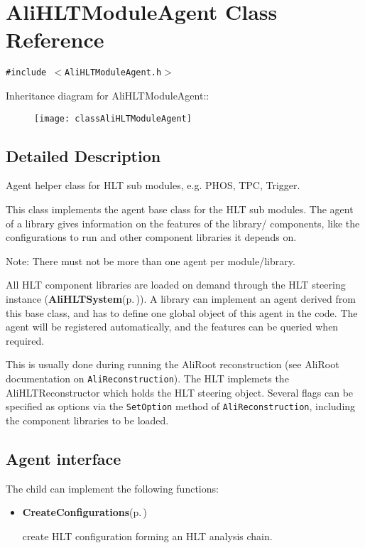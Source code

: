 \section{Ali\-HLTModule\-Agent Class Reference}
\label{classAliHLTModuleAgent}
{\tt \#include $<$Ali\-HLTModule\-Agent.h$>$}

Inheritance diagram for Ali\-HLTModule\-Agent::\begin{figure}[H]
\begin{center}
\leavevmode
\texttt{[image: classAliHLTModuleAgent]}
\end{center}
\end{figure}


\subsection{Detailed Description}
Agent helper class for HLT sub modules, e.g. PHOS, TPC, Trigger. 

This class implements the agent base class for the HLT sub modules. The agent of a library gives information on the features of the library/ components, like the configurations to run and other component libraries it depends on. \begin{Desc}
\item[Note:]There must not be more than one agent per module/library.\end{Desc}
All HLT component libraries are loaded on demand through the HLT steering instance ({\bf Ali\-HLTSystem}{\rm (p.\,\pageref{classAliHLTSystem})}). A library can implement an agent derived from this base class, and has to define one global object of this agent in the code. The agent will be registered automatically, and the features can be queried when required.

This is usually done during running the Ali\-Root reconstruction (see Ali\-Root documentation on {\tt  Ali\-Reconstruction}). The HLT implemets the Ali\-HLTReconstructor which holds the HLT steering object. Several flags can be specified as options via the {\tt Set\-Option} method of {\tt Ali\-Reconstruction}, including the component libraries to be loaded.\subsection{Agent interface}\label{classAliHLTModuleAgent_alihltmoduleagent_interface}
The child can implement the following functions:\begin{itemize}
\item {\bf Create\-Configurations}{\rm (p.\,\pageref{classAliHLTModuleAgent_a4})} \par
 create HLT configuration forming an HLT analysis chain.\end{itemize}



